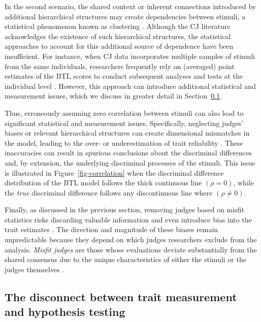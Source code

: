 \documentclass[
  authoryear,
  review,
  1p]{elsarticle}
\begin{document}
In the second scenario, the shared context or inherent connections
introduced by additional hierarchical structures may create dependencies
between stimuli, a statistical phenomenon known as clustering
\citep{Everitt_et_al_2010}. Although the CJ literature acknowledges the
existence of such hierarchical structures, the statistical approaches to
account for this additional source of dependence have been insufficient.
For instance, when CJ data incorporates multiple samples of stimuli from
the same individuals, researchers frequently rely on (averaged) point
estimates of the BTL scores to conduct subsequent analyses and tests at
the individual level
\citep{Bramley_et_al_2019, Boonen_et_al_2020, Bouwer_et_al_2023, vanDaal_et_al_2017, Jones_et_al_2019, Gijsen_et_al_2021}.
However, this approach can introduce additional statistical and
measurement issues, which we discuss in greater detail in
Section~\ref{sec-theory-issue2}.

Thus, erroneously assuming zero correlation between stimuli can also
lead to significant statistical and measurement issues. Specifically,
neglecting judges' biases or relevant hierarchical structures can create
dimensional mismatches in the model, leading to the over- or
underestimation of trait reliability \citep[pp.~341,
482]{Ackerman_1989, Hoyle_et_al_2023}. These inaccuracies can result in
spurious conclusions about the discriminal differences
\citep[pp.~370]{McElreath_2020} and, by extension, the underlying
discriminal processes of the stimuli. This issue is illustrated in
Figure~\ref{fig-correlation} when the discriminal difference
distribution of the BTL model follows the thick continuous line
\((\rho = 0)\), while the \emph{true} discriminal difference follows any
discontinuous line where \((\rho \neq 0)\).

Finally, as discussed in the previous section, removing judges based on
misfit statistics risks discarding valuable information and even
introduce bias into the trait estimates
\citep[chap.~12]{Zimmerman_1994, McElreath_2020}. The direction and
magnitude of these biases remain unpredictable because they depend on
which judges researchers exclude from the analysis. \emph{Misfit judges}
are those whose evaluations deviate substantially from the shared
consensus due to the unique characteristics of either the stimuli or the
judges themselves
\citetext{\citealp[pp.~164-165]{Pollitt_2012a}; \citealp[pp.~289-290]{Pollitt_2012b}; \citealp[pp.~4]{vanDaal_et_al_2016}; \citealp[pp.~20]{Goossens_et_al_2018}}.

\subsection{The disconnect between trait measurement and hypothesis
testing}\label{sec-theory-issue2}
\end{document}
